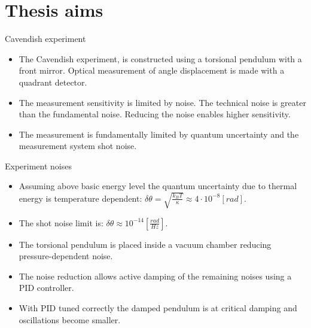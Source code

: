 \documentclass{beamer}
\begin{document}
\section{Thesis aims}
\begin{frame}{Cavendish experiment}
	\begin{itemize}
		
		\item The Cavendish experiment, is constructed using a torsional pendulum with a front mirror. Optical measurement of angle displacement is made with a quadrant detector.
		\item The measurement sensitivity is limited by noise. The technical noise is greater than the fundamental noise. Reducing the noise enables higher sensitivity.
		\pause
		\item The measurement is fundamentally limited by quantum uncertainty and the measurement system shot noise. 
		
	\end{itemize}
\end{frame}

\begin{frame}{Experiment noises}
	\begin{itemize}
		
		\item Assuming above basic energy level the quantum uncertainty due to thermal energy is temperature dependent: $\delta\theta = \sqrt{\frac{k_B T}{\kappa}} \approx 4\cdot 10^{-8} [rad]$.
		\item The shot noise limit is: $\delta\theta \approx 10^{-14} [\frac{rad}{Hz}] $.
		\pause
		\item The torsional pendulum is placed inside a vacuum chamber reducing pressure-dependent noise. 
		\item The noise reduction allows active damping of the remaining noises using a PID controller. 
		\item With PID tuned correctly the damped pendulum is at critical damping and oscillations become smaller.

		
	\end{itemize}
\end{frame}
\end{document}
